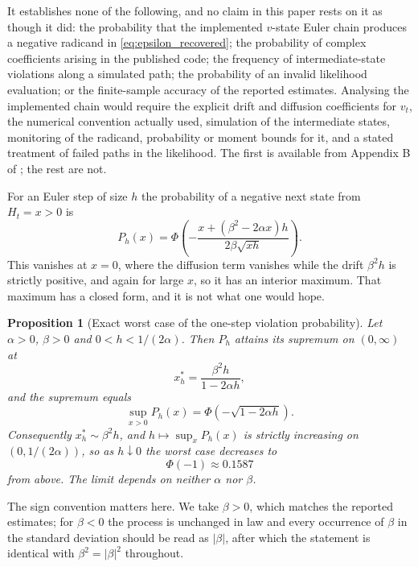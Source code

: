\documentclass[11pt]{article}
\newtheorem{proposition}[proposition]{Proposition}
\theoremstyle{definition}
\begin{document}
It establishes none of the following, and no claim in this paper rests on it as though it did: the probability that the implemented $v$-state Euler chain produces a negative radicand in \eqref{eq:epsilon_recovered}; the probability of complex coefficients arising in the published code; the frequency of intermediate-state violations along a simulated path; the probability of an invalid likelihood evaluation; or the finite-sample accuracy of the reported estimates. Analysing the implemented chain would require the explicit drift and diffusion coefficients for $v_t$, the numerical convention actually used, simulation of the intermediate states, monitoring of the radicand, probability or moment bounds for it, and a stated treatment of failed paths in the likelihood. The first is available from Appendix B of \citet{BrandtSantaClara2002}; the rest are not.

For an Euler step of size $h$ the probability of a negative next state from $H_t=x>0$ is
\begin{equation}\label{eq:negative_prob}
P_h(x)=\Phi\!\left(
-\frac{x+(\beta^2-2\alpha x)h}{2\beta\sqrt{xh}}
\right).
\end{equation}
This vanishes at $x=0$, where the diffusion term vanishes while the drift $\beta^2h$ is strictly positive, and again for large $x$, so it has an interior maximum. That maximum has a closed form, and it is not what one would hope.

\begin{proposition}[Exact worst case of the one-step violation probability]\label{prop:worst_case_boundary}
Let $\alpha>0$, $\beta>0$ and $0<h<1/(2\alpha)$. Then $P_h$ attains its supremum on $(0,\infty)$ at
\begin{equation}\label{eq:worst_case_argmax}
x_h^*=\frac{\beta^2h}{1-2\alpha h},
\end{equation}
and the supremum equals
\begin{equation}\label{eq:worst_case}
\sup_{x>0}P_h(x)=\Phi\!\left(-\sqrt{1-2\alpha h}\right).
\end{equation}
Consequently $x_h^*\sim\beta^2h$, and $h\mapsto\sup_xP_h(x)$ is strictly increasing on $(0,1/(2\alpha))$, so as $h\downarrow0$ the worst case \emph{decreases} to
\[
\Phi(-1)\approx0.1587
\]
from above. The limit depends on neither $\alpha$ nor $\beta$.
\end{proposition}

The sign convention matters here. We take $\beta>0$, which matches the reported estimates; for $\beta<0$ the process is unchanged in law and every occurrence of $\beta$ in the standard deviation should be read as $|\beta|$, after which the statement is identical with $\beta^2=|\beta|^2$ throughout.
\end{document}
